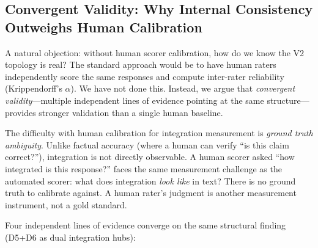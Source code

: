 \documentclass[12pt,letterpaper]{article}
\begin{document}
\subsection{Convergent Validity: Why Internal Consistency Outweighs Human Calibration}
\label{sec:convergent-validity}

A natural objection: without human scorer calibration, how do we know the V2 topology is real? The standard approach would be to have human raters independently score the same responses and compute inter-rater reliability (Krippendorff's $\alpha$). We have not done this. Instead, we argue that \emph{convergent validity}---multiple independent lines of evidence pointing at the same structure---provides stronger validation than a single human baseline.

The difficulty with human calibration for integration measurement is \emph{ground truth ambiguity}. Unlike factual accuracy (where a human can verify ``is this claim correct?''), integration is not directly observable. A human scorer asked ``how integrated is this response?'' faces the same measurement challenge as the automated scorer: what does integration \emph{look like} in text? There is no ground truth to calibrate against. A human rater's judgment is another measurement instrument, not a gold standard.

Four independent lines of evidence converge on the same structural finding (D5+D6 as dual integration hubs):
\end{document}
